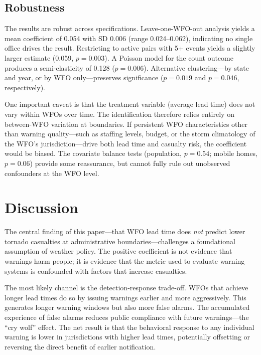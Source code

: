 \documentclass[12pt]{article}
\begin{document}
\subsection{Robustness}

The results are robust across specifications. Leave-one-WFO-out analysis yields a mean coefficient of 0.054 with SD 0.006 (range 0.024--0.062), indicating no single office drives the result. Restricting to active pairs with 5+ events yields a slightly larger estimate (0.059, $p = 0.003$). A Poisson model for the count outcome produces a semi-elasticity of 0.128 ($p = 0.006$). Alternative clustering---by state and year, or by WFO only---preserves significance ($p = 0.019$ and $p = 0.046$, respectively).

One important caveat is that the treatment variable (average lead time) does not vary within WFOs over time. The identification therefore relies entirely on between-WFO variation at boundaries. If persistent WFO characteristics other than warning quality---such as staffing levels, budget, or the storm climatology of the WFO's jurisdiction---drive both lead time and casualty risk, the coefficient would be biased. The covariate balance tests (population, $p = 0.54$; mobile homes, $p = 0.06$) provide some reassurance, but cannot fully rule out unobserved confounders at the WFO level.


\section{Discussion}

The central finding of this paper---that WFO lead time does \textit{not} predict lower tornado casualties at administrative boundaries---challenges a foundational assumption of weather policy. The positive coefficient is not evidence that warnings harm people; it is evidence that the metric used to evaluate warning systems is confounded with factors that increase casualties.

The most likely channel is the detection-response trade-off. WFOs that achieve longer lead times do so by issuing warnings earlier and more aggressively. This generates longer warning windows but also more false alarms. The accumulated experience of false alarms reduces public compliance with future warnings---the ``cry wolf'' effect. The net result is that the behavioral response to any individual warning is lower in jurisdictions with higher lead times, potentially offsetting or reversing the direct benefit of earlier notification.
\end{document}
